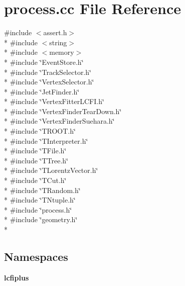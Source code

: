 \section{process.\-cc File Reference}
\label{process_8cc}
{\ttfamily \#include $<$assert.\-h$>$}\\*
{\ttfamily \#include $<$string$>$}\\*
{\ttfamily \#include $<$memory$>$}\\*
{\ttfamily \#include \char`\"{}Event\-Store.\-h\char`\"{}}\\*
{\ttfamily \#include \char`\"{}Track\-Selector.\-h\char`\"{}}\\*
{\ttfamily \#include \char`\"{}Vertex\-Selector.\-h\char`\"{}}\\*
{\ttfamily \#include \char`\"{}Jet\-Finder.\-h\char`\"{}}\\*
{\ttfamily \#include \char`\"{}Vertex\-Fitter\-L\-C\-F\-I.\-h\char`\"{}}\\*
{\ttfamily \#include \char`\"{}Vertex\-Finder\-Tear\-Down.\-h\char`\"{}}\\*
{\ttfamily \#include \char`\"{}Vertex\-Finder\-Suehara.\-h\char`\"{}}\\*
{\ttfamily \#include \char`\"{}T\-R\-O\-O\-T.\-h\char`\"{}}\\*
{\ttfamily \#include \char`\"{}T\-Interpreter.\-h\char`\"{}}\\*
{\ttfamily \#include \char`\"{}T\-File.\-h\char`\"{}}\\*
{\ttfamily \#include \char`\"{}T\-Tree.\-h\char`\"{}}\\*
{\ttfamily \#include \char`\"{}T\-Lorentz\-Vector.\-h\char`\"{}}\\*
{\ttfamily \#include \char`\"{}T\-Cut.\-h\char`\"{}}\\*
{\ttfamily \#include \char`\"{}T\-Random.\-h\char`\"{}}\\*
{\ttfamily \#include \char`\"{}T\-Ntuple.\-h\char`\"{}}\\*
{\ttfamily \#include \char`\"{}process.\-h\char`\"{}}\\*
{\ttfamily \#include \char`\"{}geometry.\-h\char`\"{}}\\*
\subsection*{Namespaces}
\begin{DoxyCompactItemize}
\item 
{\bf lcfiplus}
\end{DoxyCompactItemize}
